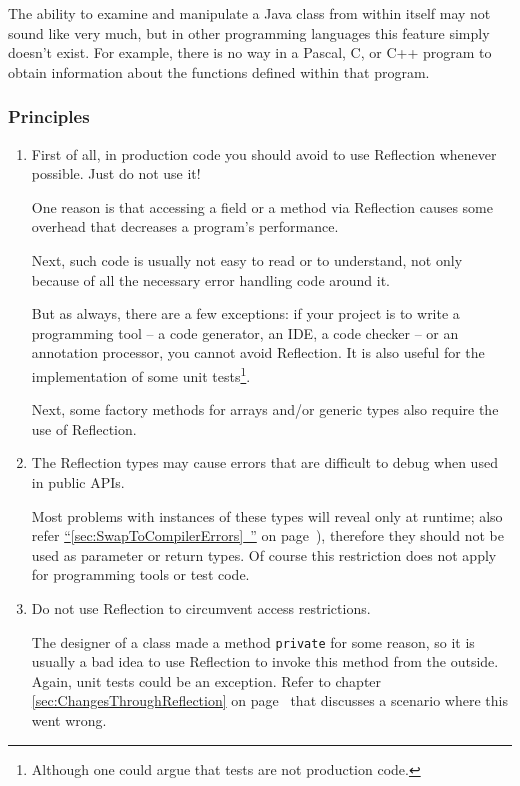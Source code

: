 \documentclass[11pt,a4paper, titlepage, parskip=half, headsepline, footsepline, cleardoublepage=current, headheight=1cm]{scrbook}
\newcommand*{\tqfullvref}[1]{\hyperref[{#1}]{“\ref*{#1}~\nameref*{#1}”} on page~\pageref{#1}}
\newcommand*{\tqvref}[1]{\hyperref[{#1}]{\ref*{#1}} on page~\pageref{#1}}
\begin{document}
The ability to examine and manipulate a Java class from within itself may not sound like very much, but in other programming languages this feature simply doesn't exist. For example, there is no way in a Pascal, C, or C++ program to obtain information about the functions defined within that program.

\subsubsection{Principles}
\begin{enumerate}[label=P\arabic*.]
\item{First of all, in production code you should avoid to use Reflection whenever possible. Just do not use it!

One reason is that accessing a field or a method via Reflection causes some overhead that decreases a program’s performance. 

Next, such code is usually not easy to read or to understand, not only because of all the necessary error handling code around it.

But as always, there are a few exceptions: if your project is to write a programming tool – a code generator, an IDE, a code checker – or an annotation processor, you cannot avoid Reflection. It is also useful for the implementation of some unit tests\footnote{Although one could argue that tests are not production code.}.

Next, some factory methods for arrays and/or generic types also require the use of Reflection.}

\item{The Reflection types may cause errors that are difficult to debug when used in public APIs.

Most problems with instances of these types will reveal only at runtime; also refer \tqfullvref{sec:SwapToCompilerErrors}), therefore they should not be used as parameter or return types. Of course this restriction does not apply for programming tools or test code.}

\item{Do not use Reflection to circumvent access restrictions.

The designer of a class made a method \lstinline|private| for some reason, so it is usually a bad idea to use Reflection to invoke this method from the outside. Again, unit tests could be an exception. Refer to chapter \tqvref{sec:ChangesThroughReflection} that discusses a scenario where this went wrong.}


\end{enumerate}
\end{document}
